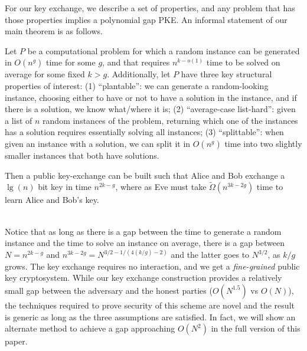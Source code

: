 
For our key exchange, we describe a set of properties, and any problem that has those properties implies a polynomial gap PKE. An informal statement of our main theorem is as follows.\\


\begin{theoremNon}
Let $P$ be a computational problem for which a random instance can be generated in $O(n^g)$ time for some $g$, and that
requires $n^{k-o(1)}$ time to be solved on average for some fixed $k>g$.
Additionally, let $P$ have three key structural properties of interest: (1) ``plantable'': we can generate a random-looking instance, choosing either to have or not to have a solution in the instance, and if there is a solution, we know what/where it is; (2)
``average-case list-hard'':  
given a list of $n$ random instances
of the problem, returning which one of the instances has a solution requires essentially
solving all instances;
(3) ``splittable'': when given an instance with a solution, we can
split it in $O(n^g)$ time into two slightly smaller instances that both have solutions.

Then a public key-exchange can be built such that Alice and Bob exchange a $\lg(n)$ bit key in time $n^{2k-g}$, where as Eve must take $\tilde{\Omega}(n^{3k-2g})$ time to learn Alice and Bob's key.
\end{theoremNon}\\

Notice that as long as there is a gap between the time to generate a random instance and the time to solve an instance on average, there is a gap between $N=n^{2k-g}$ and $n^{3k-2g}=N^{3/2 - 1/(4(k/g)-2)}$ and the latter goes to $N^{3/2}$, as $k/g$ grows.
The key exchange requires no interaction, and we get a \emph{fine-grained} public key cryptosystem.
While our key exchange construction provides a relatively small gap between the adversary and the honest parties ($O(N^{1.5})$ vs $O(N)$),  the techniques required to prove security of this scheme are novel and the result is generic as long as the three assumptions are satisfied. In fact, we will show an alternate method to achieve a gap approaching $O(N^2)$ in the full version of this paper.


